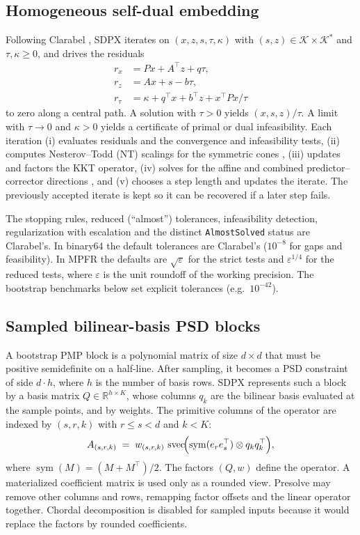 \documentclass[11pt]{article}
\newcommand{\R}{\mathbb{R}}
\newcommand{\K}{\mathcal{K}}
\newcommand{\svec}{\operatorname{svec}}
\newcommand{\code}[1]{\texttt{#1}}
\newcommand{\eps}{\varepsilon}
\begin{document}
\subsection{Homogeneous self-dual embedding}

Following Clarabel \cite{GoulartChen2024}, SDPX iterates on
$(x, z, s, \tau, \kappa)$ with $(s,z)\in\K\times\K^*$ and $\tau,\kappa \ge 0$,
and drives the residuals
\begin{align}
  r_x &= Px + A^\top z + q\tau, \\
  r_z &= Ax + s - b\tau, \\
  r_\tau &= \kappa + q^\top x + b^\top z + x^\top P x/\tau
\end{align}
to zero along a central path. A solution with $\tau > 0$ yields
$(x,s,z)/\tau$. A limit with $\tau \to 0$ and $\kappa > 0$ yields a
certificate of primal or dual infeasibility. Each iteration (i) evaluates
residuals and the convergence and infeasibility tests, (ii) computes
Nesterov--Todd (NT) scalings for the symmetric cones
\cite{NesterovTodd1997,NesterovTodd1998}, (iii) updates and factors the KKT
operator, (iv) solves for the affine and combined predictor--corrector
directions \cite{Mehrotra1992}, and (v) chooses a step length and updates the
iterate. The previously accepted iterate is kept so it can be recovered if a
later step fails.

The stopping rules, reduced (``almost'') tolerances, infeasibility detection,
regularization with escalation and the distinct \code{AlmostSolved} status are
Clarabel's. In binary64 the default tolerances are Clarabel's ($10^{-8}$ for
gaps and feasibility). In MPFR the defaults are $\sqrt{\eps}$ for the strict
tests and $\eps^{1/4}$ for the reduced tests, where $\eps$ is the unit
roundoff of the working precision. The bootstrap benchmarks below set explicit
tolerances (e.g.\ $10^{-42}$).

\subsection{Sampled bilinear-basis PSD blocks}
\label{sec:sampled}

A bootstrap PMP block is a polynomial matrix of size $d\times d$ that must be
positive semidefinite on a half-line. After sampling, it becomes a PSD
constraint of side $d\cdot h$, where $h$ is the number of basis rows. SDPX
represents such a block by a basis matrix $Q\in\R^{h\times K}$, whose columns
$q_k$ are the bilinear basis evaluated at the sample points, and by weights.
The primitive columns of the operator are indexed by $(s, r, k)$ with
$r\le s<d$ and $k<K$:
\begin{equation}
  A_{(s,r,k)} \;=\; w_{(s,r,k)}\,
  \svec\!\Bigl(\operatorname{sym}(e_r e_s^\top) \otimes q_k q_k^\top\Bigr),
  \label{eq:sampled-col}
\end{equation}
where $\operatorname{sym}(M) = (M+M^\top)/2$. The factors $(Q, w)$ define the
operator. A materialized coefficient matrix is used only as a rounded view.
Presolve may remove other columns and rows, remapping factor offsets and the
linear operator together. Chordal decomposition is disabled for sampled inputs
because it would replace the factors by rounded coefficients.
\end{document}
